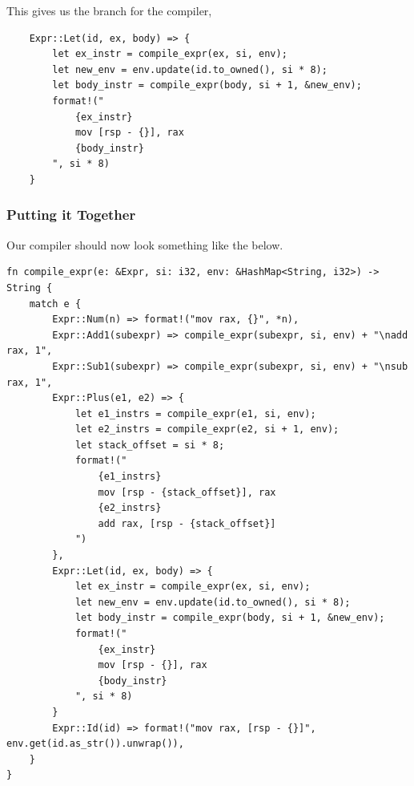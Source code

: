 This gives us the branch for the compiler,
\begin{verbatim}
    Expr::Let(id, ex, body) => {
        let ex_instr = compile_expr(ex, si, env);
        let new_env = env.update(id.to_owned(), si * 8);
        let body_instr = compile_expr(body, si + 1, &new_env);
        format!("
            {ex_instr}
            mov [rsp - {}], rax
            {body_instr}
        ", si * 8)
    }
\end{verbatim}

\subsubsection{Putting it Together}
Our compiler should now look something like the below.
\begin{verbatim}
fn compile_expr(e: &Expr, si: i32, env: &HashMap<String, i32>) -> String {
    match e {
        Expr::Num(n) => format!("mov rax, {}", *n),
        Expr::Add1(subexpr) => compile_expr(subexpr, si, env) + "\nadd rax, 1",
        Expr::Sub1(subexpr) => compile_expr(subexpr, si, env) + "\nsub rax, 1",
        Expr::Plus(e1, e2) => {
            let e1_instrs = compile_expr(e1, si, env);
            let e2_instrs = compile_expr(e2, si + 1, env);
            let stack_offset = si * 8;
            format!("
                {e1_instrs}
                mov [rsp - {stack_offset}], rax
                {e2_instrs}
                add rax, [rsp - {stack_offset}]
            ")
        },
        Expr::Let(id, ex, body) => {
            let ex_instr = compile_expr(ex, si, env);
            let new_env = env.update(id.to_owned(), si * 8);
            let body_instr = compile_expr(body, si + 1, &new_env);
            format!("
                {ex_instr}
                mov [rsp - {}], rax
                {body_instr}
            ", si * 8)
        }
        Expr::Id(id) => format!("mov rax, [rsp - {}]", env.get(id.as_str()).unwrap()),
    }
}
\end{verbatim}